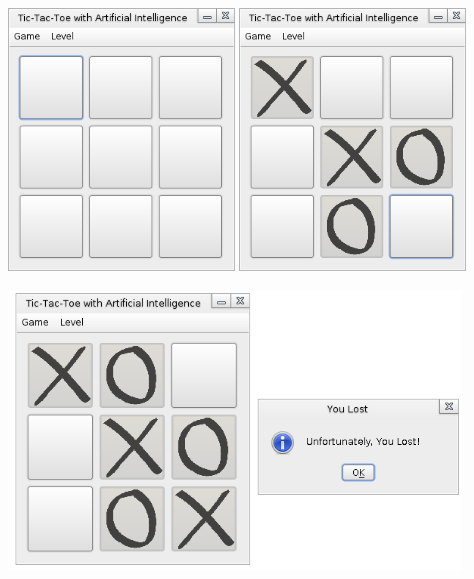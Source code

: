 \begin{center}
\includegraphics[width=0.45\textwidth]{./game1}
\hspace*{0.1em}
\includegraphics[width=0.45\textwidth]{./game2}

\includegraphics[width=0.9\textwidth]{./game3}
\vspace*{0.3em}


\end{center}
